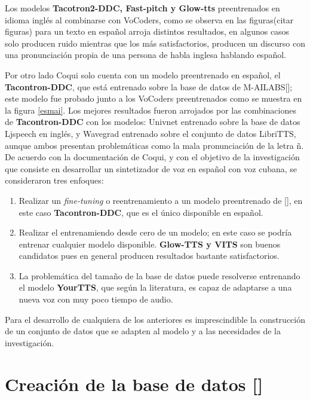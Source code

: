 Los modelos \textbf{Tacotron2-DDC, Fast-pitch y Glow-tts} preentrenados en idioma inglés al combinarse con VoCoders, como se observa en las figuras(citar figuras) para un texto en español arroja distintos resultados, en algunos casos solo producen ruido mientras que los más satisfactorios, producen un discurso con una pronunciación propia de una persona de habla inglesa hablando español.

Por otro lado Coqui solo cuenta con un modelo preentrenado en español, el \textbf{Tacontron-DDC}, que está entrenado sobre la base de datos de M-AILABS[\cite{mailabs}]; este modelo fue probado junto a los VoCoders preentrenados como se muestra en la figura \ref{esmai}. Los mejores resultados fueron arrojados por las combinaciones de \textbf{Tacontron-DDC} con los modelos: Univnet entrenado sobre la base de datos Ljspeech en inglés, y Wavegrad entrenado sobre el conjunto de datos LibriTTS, aunque ambos presentan problemáticas como la mala pronunciación de la letra ñ.\\

De acuerdo con la documentación de Coqui, y con el objetivo de la investigación que consiste en desarrollar un sintetizador de voz en español con voz cubana, se consideraron tres enfoques:

\begin{enumerate}
	\item Realizar un \textit{fine-tuning} o reentrenamiento a un modelo preentrenado de [\cite{coqui-doc}], en este caso \textbf{Tacontron-DDC}, que es el único disponible en español. 
	
	\item Realizar el entrenamiendo desde cero de un modelo; en este caso se podría entrenar cualquier modelo disponible. \textbf{Glow-TTS y VITS} son buenos candidatos pues en general producen resultados bastante satisfactorios.
	
	\item La problemática del tamaño de la base de datos puede resolverse entrenando el modelo \textbf{YourTTS}, que según la literatura, es capaz de adaptarse a una nueva voz con muy poco tiempo de audio.
\end{enumerate}

Para el desarrollo de cualquiera de los anteriores es imprescindible la construcción de un conjunto de datos que se adapten al modelo y a las necesidades de la investigación.


\section{Creación de la base de datos [\cite{formatting-dataset}]}


